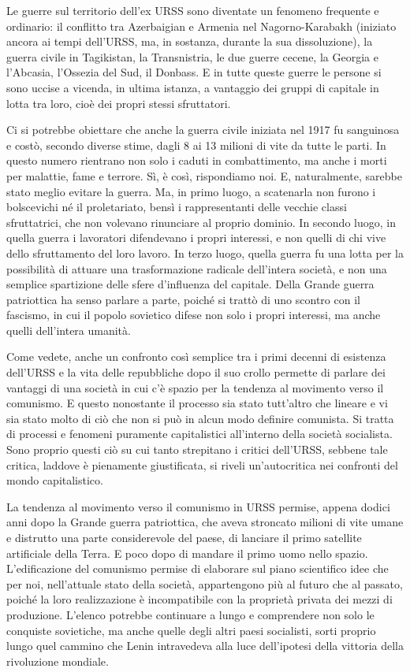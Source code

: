\documentclass[12pt,a4paper,openany]{book}
\begin{document}
Le guerre sul territorio dell'ex URSS sono diventate un fenomeno frequente e ordinario: il conflitto tra Azerbaigian e Armenia nel Nagorno-Karabakh (iniziato ancora ai tempi dell'URSS, ma, in sostanza, durante la sua dissoluzione), la guerra civile in Tagikistan, la Transnistria, le due guerre cecene, la Georgia e l'Abcasia, l'Ossezia del Sud, il Donbass. E in tutte queste guerre le persone si sono uccise a vicenda, in ultima istanza, a vantaggio dei gruppi di capitale in lotta tra loro, cioè dei propri stessi sfruttatori.

Ci si potrebbe obiettare che anche la guerra civile iniziata nel 1917 fu sanguinosa e costò, secondo diverse stime, dagli 8 ai 13 milioni di vite da tutte le parti. In questo numero rientrano non solo i caduti in combattimento, ma anche i morti per malattie, fame e terrore. Sì, è così, rispondiamo noi. E, naturalmente, sarebbe stato meglio evitare la guerra. Ma, in primo luogo, a scatenarla non furono i bolscevichi né il proletariato, bensì i rappresentanti delle vecchie classi sfruttatrici, che non volevano rinunciare al proprio dominio. In secondo luogo, in quella guerra i lavoratori difendevano i propri interessi, e non quelli di chi vive dello sfruttamento del loro lavoro. In terzo luogo, quella guerra fu una lotta per la possibilità di attuare una trasformazione radicale dell'intera società, e non una semplice spartizione delle sfere d'influenza del capitale. Della Grande guerra patriottica ha senso parlare a parte, poiché si trattò di uno scontro con il fascismo, in cui il popolo sovietico difese non solo i propri interessi, ma anche quelli dell'intera umanità.

Come vedete, anche un confronto così semplice tra i primi decenni di esistenza dell'URSS e la vita delle repubbliche dopo il suo crollo permette di parlare dei vantaggi di una società in cui c'è spazio per la tendenza al movimento verso il comunismo. E questo nonostante il processo sia stato tutt'altro che lineare e vi sia stato molto di ciò che non si può in alcun modo definire comunista. Si tratta di processi e fenomeni puramente capitalistici all'interno della società socialista. Sono proprio questi ciò su cui tanto strepitano i critici dell'URSS, sebbene tale critica, laddove è pienamente giustificata, si riveli un'autocritica nei confronti del mondo capitalistico.

La tendenza al movimento verso il comunismo in URSS permise, appena dodici anni dopo la Grande guerra patriottica, che aveva stroncato milioni di vite umane e distrutto una parte considerevole del paese, di lanciare il primo satellite artificiale della Terra. E poco dopo di mandare il primo uomo nello spazio. L'edificazione del comunismo permise di elaborare sul piano scientifico idee che per noi, nell'attuale stato della società, appartengono più al futuro che al passato, poiché la loro realizzazione è incompatibile con la proprietà privata dei mezzi di produzione. L'elenco potrebbe continuare a lungo e comprendere non solo le conquiste sovietiche, ma anche quelle degli altri paesi socialisti, sorti proprio lungo quel cammino che Lenin intravedeva alla luce dell'ipotesi della vittoria della rivoluzione mondiale.
\end{document}
